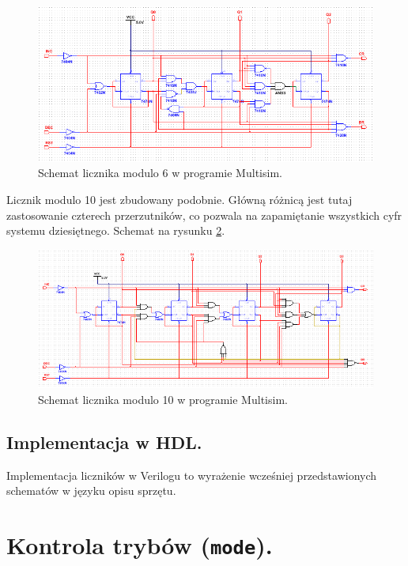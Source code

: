 \documentclass[a4paper,oneside]{report}
\newcommand{\counter}[1]{\texttt{counter\textunderscore #1}}
\newcommand{\mode}{\texttt{mode}}
\begin{document}
\begin{figure}[h]
\centering
\includegraphics[width=\textwidth]{counter6.png}
\caption[Schemat licznika modulo 6.]{Schemat licznika modulo 6 w programie Multisim.}
\label{counter6_scheme}
\end{figure}

Licznik modulo 10 jest zbudowany podobnie. Główną różnicą jest tutaj
zastosowanie czterech przerzutników, co pozwala na zapamiętanie
wszystkich cyfr systemu dziesiętnego. Schemat na rysunku
\ref{counter10_scheme}.
\begin{figure}[h]
\centering
\includegraphics[width=\textwidth]{counter10.png}
\caption[Schemat licznika modulo 10.]{Schemat licznika modulo 10 w programie Multisim.}
\label{counter10_scheme}
\end{figure}

\pagebreak
\subsection{Implementacja w HDL.}
Implementacja liczników w Verilogu to wyrażenie wcześniej
przedstawionych schematów w języku opisu sprzętu.



\section{Kontrola trybów (\mode).}
\end{document}
